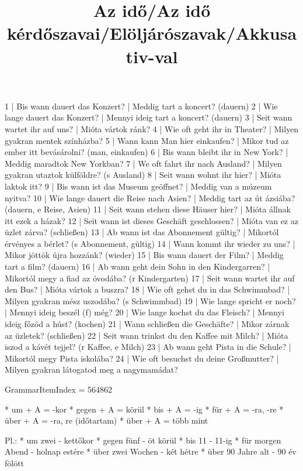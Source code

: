 \begin{exmp}
1 | Bis wann dauert das Konzert? | Meddig tart a koncert? (dauern)
2 | Wie lange dauert das Konzert? | Mennyi ideig tart a koncert? (dauern)
3 | Seit wann wartet ihr auf uns? | Mióta vártok ránk?
4 | Wie oft geht ihr in Theater? | Milyen gyakran mentek színházba?
5 | Wann kann Man hier einkaufen? | Mikor tud az ember itt bevásárolni? (man, einkaufen)
6 | Bis wann bleibt ihr in New York? | Meddig maradtok New Yorkban?
7 | We oft fahrt ihr nach Ausland? | Milyen gyakran utaztok külföldre? (s Ausland)
8 | Seit wann wohnt ihr hier? | Mióta laktok itt?
9 | Bis wann ist das Museum geöffnet? | Meddig van a múzeum nyitva?
10 | Wie lange dauert die Reise nach Asien? | Meddig tart az út ázsiába? (dauern, e Reise, Asien)
11 | Seit wann stehen diese Häuser hier? | Mióta állnak itt ezek a házak?
12 | Seit wann ist dieses Geschäft geschlossen? | Mióta van ez az üzlet zárva? (schließen)
13 | Ab wann ist das Abonnement gültig? | Mikortól érvényes a bérlet? (s Abonnement, gültig)
14 | Wann kommt ihr wieder zu uns? | Mikor jöttök újra hozzánk? (wieder)
15 | Bis wann dauert der Film? | Meddig tart a film? (dauern)
16 | Ab wann geht dein Sohn in den Kindergarren? | Mikortól megy a fiad az óvodába? (r Kindergarten)
17 | Seit wann wartet ihr auf den Bus? | Mióta vártok a buszra?
18 | Wie oft gehst du in das Schwimmbad? | Milyen gyakran mész uszodába? (s Schwimmbad)
19 | Wie lange spricht er noch? | Mennyi ideig beszél (f) még?
20 | Wie lange kochst du das Fleisch? | Mennyi ideig főzöd a húst? (kochen)
21 | Wann schließen die Geschäfte? | Mikor zárnak az üzletek? (schließen)
22 | Seit wann trinkst du den Kaffee mit Milch? | Mióta iszod a kávét tejjel? (r Kaffee, e Milch) 
23 | Ab wann geht Pista in die Schule? | Mikortól megy Pista iskolába?
24 | Wie oft besuchst du deine Großmutter? | Milyen gyakran látogatod meg a nagymamádat?
\end{exmp}

\title{Az idő/Az idő kérdőszavai/Elöljárószavak/Akkusativ-val}

GrammarItemIndex = 564862

\begin{desc}
* um + A = -kor
* gegen + A = körül
* bis + A = -ig
* für + A = -ra, -re
* über + A = -ra, re (időtartam)
* über + A = több mint

Pl.: * um zwei - kettőkor
* gegen fünf - öt körül
* bis 11 - 11-ig
* für morgen Abend - holnap estére
* über zwei Wochen - két hétre
* über 90 Jahre alt - 90 év fölött
\end{desc}

